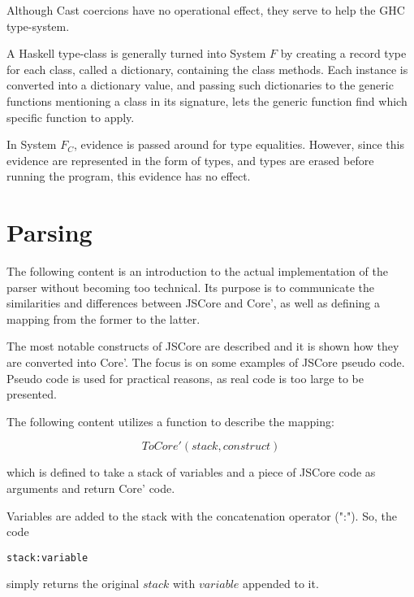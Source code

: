 Although Cast coercions have no operational effect, they serve to help the
GHC type-system.


A Haskell type-class is generally turned into System $F$ by creating a 
record type for each class, called a dictionary, containing the class methods.
Each instance is converted into a dictionary value, and passing such 
dictionaries to the generic functions mentioning a class in its signature,
lets the generic function find which specific function to apply.
\cite{sulzmann2007system}


In System $F_C$, evidence is passed around for type equalities. However,
since this evidence are represented in the form of types, and types are
erased before running the program, this evidence has no effect.
\cite{sulzmann2007system}

\section{Parsing}

The following content is an introduction to the actual implementation
of the parser without becoming too technical. Its purpose is to communicate
the similarities and differences between JSCore 
and Core', as well as defining a mapping from the former to the latter.

The most notable constructs of JSCore are described and it is shown how they
are converted into Core'. The focus is on some examples of JSCore pseudo code.
Pseudo code is used for practical reasons, as real code is too large to be 
presented.

The following content utilizes a function to describe the mapping:

\begin{equation*}
ToCore'(stack, construct)
\end{equation*}

which is defined to take a stack of variables and a piece of JSCore code 
as arguments and return Core' code. 

Variables are added to the stack with the concatenation operator (":"). 
So, the code 
\lstset{ %
language=Haskell,
}
\begin{lstlisting}
stack:variable 
\end{lstlisting}
simply returns the original $stack$ with $variable$ appended to it.

